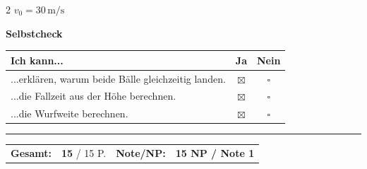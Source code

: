 \documentclass[10pt, a4paper]{article}
\newcommand{\fachfarbe}{physik}
\newcommand{\lsg}[1]{\textcolor{loesung}{\textbf{#1}}}
\newcommand{\abschnitt}[1]{%
    \vspace{8pt}
    \noindent\textbf{\textcolor{\fachfarbe}{#1}}
    \vspace{4pt}
}
\begin{document}
\begin{multicols}{2}
{$\boxed{v_0 = 30\,\text{m/s}}$
}

\vspace{8pt}


\abschnitt{Selbstcheck}

\begin{tabular}{|p{5.5cm}|c|c|}
\hline
\textbf{Ich kann...} & \textbf{Ja} & \textbf{Nein} \\
\hline
...erklären, warum beide Bälle gleichzeitig landen. & \lsg{$\boxtimes$} & $\square$ \\
\hline
...die Fallzeit aus der Höhe berechnen. & \lsg{$\boxtimes$} & $\square$ \\
\hline
...die Wurfweite berechnen. & \lsg{$\boxtimes$} & $\square$ \\
\hline
\end{tabular}

\end{multicols}


\vfill
\hrule
\vspace{4pt}
\small
\begin{tabular}{llll}
\textbf{Gesamt:} & \lsg{15} / 15 P. &
\textbf{Note/NP:} & \lsg{15 NP / Note 1}
\end{tabular}
\end{document}
